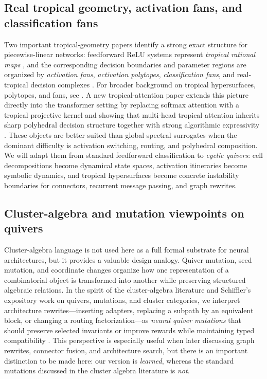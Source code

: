 \documentclass[11pt]{article}
\theoremstyle{definition}
\theoremstyle{plain}
\theoremstyle{remark}
\begin{document}
\subsection{Real tropical geometry, activation fans, and classification fans}
Two important tropical-geometry papers identify a strong exact structure for piecewise-linear networks:
feedforward ReLU systems represent \emph{tropical rational maps} \cite{ZhangNaitzatLim2018}, and the corresponding decision boundaries and parameter regions are organized by \emph{activation fans}, \emph{activation polytopes}, \emph{classification fans}, and real-tropical decision complexes \cite{BrandenburgLohoMontufar2024}.
For broader background on tropical hypersurfaces, polytopes, and fans, see \cite{MaclaganSturmfelsTropical}.
A new tropical-attention paper extends this picture directly into the transformer setting by replacing softmax attention with a tropical projective kernel and showing that multi-head tropical attention inherits sharp polyhedral decision structure together with strong algorithmic expressivity \cite{HashemiPasqueTeskaYoshida2025}.
These objects are better suited than global spectral surrogates when the dominant difficulty is activation switching, routing, and polyhedral composition.
We will adapt them from standard feedforward classification to \emph{cyclic quivers}: cell decompositions become dynamical state spaces, activation itineraries become symbolic dynamics, and tropical hypersurfaces become concrete instability boundaries for connectors, recurrent message passing, and graph rewrites. 

\subsection{Cluster-algebra and mutation viewpoints on quivers}
\label{sec:cluster}

Cluster-algebra language is not used here as a full formal substrate for neural architectures, but it provides a valuable design analogy.
Quiver mutation, seed mutation, and coordinate changes organize how one representation of a combinatorial object is transformed into another while preserving structured algebraic relations.
In the spirit of the cluster-algebra literature and Schiffler's expository work on quivers, mutations, and cluster categories, we interpret architecture rewrites---inserting adapters, replacing a subpath by an equivalent block, or changing a routing factorization---as \emph{neural quiver mutations} that should preserve selected invariants or improve rewards while maintaining typed compatibility \cite{FominWilliamsZelevinsky2016,SchifflerClusterNotes,SchifflerQuiverReps}.
This perspective is especially useful when later discussing graph rewrites, connector fusion, and architecture search, but there is an important distinction to be made here: our version is \emph{learned}, whereas the standard mutations discussed in the cluster algebra literature is \emph{not}. 
\end{document}
